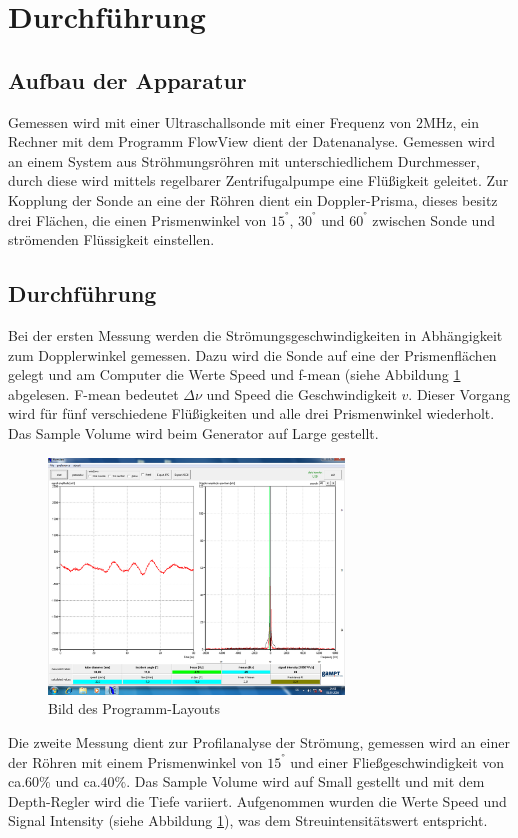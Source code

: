 \section{Durchführung}
\label{sec:Durchführung}
\subsection{Aufbau der Apparatur}
Gemessen wird mit einer Ultraschallsonde mit einer Frequenz von $2\si{\mega\hertz}$, ein
Rechner mit dem Programm FlowView dient der Datenanalyse. Gemessen wird an einem System aus Ströhmungsröhren mit unterschiedlichem
Durchmesser, durch diese wird mittels regelbarer Zentrifugalpumpe eine Flüßigkeit geleitet. Zur Kopplung der Sonde an eine der Röhren dient ein Doppler-Prisma,
dieses besitz drei Flächen, die einen Prismenwinkel von $15^°$, $30^°$ und $60^°$ zwischen Sonde und strömenden Flüssigkeit einstellen.

\subsection{Durchführung}
\label{sec:durch}
Bei der ersten Messung werden die Strömungsgeschwindigkeiten in Abhängigkeit zum Dopplerwinkel gemessen. Dazu wird die Sonde auf eine der Prismenflächen gelegt und am Computer die Werte Speed und
f-mean (siehe Abbildung \ref{fig:bsp} abgelesen. F-mean bedeutet $\Delta\nu$ und Speed die Geschwindigkeit $v$.
Dieser Vorgang wird für fünf verschiedene Flüßigkeiten und alle drei Prismenwinkel wiederholt. Das Sample Volume wird beim Generator auf Large gestellt.
 \begin{figure}
  \includegraphics[width=0.7\textwidth]{Unbenannt.png}
  \centering
   \caption{Bild des Programm-Layouts }
   \label{fig:bsp}
 \end{figure}

 Die zweite Messung dient zur Profilanalyse der Strömung,
 gemessen wird an einer der Röhren mit einem Prismenwinkel von $15^°$ und einer
 Fließgeschwindigkeit von ca.$60\%$ und ca.$40\%$.
 Das Sample Volume wird auf Small gestellt und mit dem Depth-Regler wird die Tiefe variiert.
 Aufgenommen wurden die Werte Speed und Signal Intensity (siehe Abbildung \ref{fig:bsp}), was dem Streuintensitätswert entspricht.
